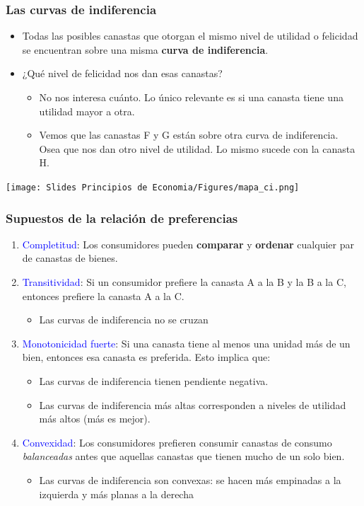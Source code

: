 \documentclass{beamer}
\begin{document}
\begin{frame}
\frametitle{Las curvas de indiferencia}
\begin{itemize}
    \item Todas las posibles canastas que otorgan el mismo nivel de utilidad o felicidad se encuentran sobre una misma \textbf{curva de indiferencia}. \vspace{2mm}
    \item ¿Qué nivel de felicidad nos dan esas canastas? 
    \begin{itemize}
    \item No nos interesa cuánto. Lo único relevante es si una canasta tiene una utilidad mayor a otra. 
    \item Vemos que las canastas F y G están sobre otra curva de indiferencia. Osea que nos dan otro nivel de utilidad. Lo mismo sucede con la canasta H. \vspace{1mm}
    \end{itemize}
     \end{itemize}
    \centering
    \texttt{[image: Slides Principios de Economia/Figures/mapa\_ci.png]}
\end{frame}

\begin{frame}
\frametitle{Supuestos de la relación de preferencias}
\begin{enumerate}
\item \textcolor{blue}{Completitud}: Los consumidores pueden \textbf{comparar} y \textbf{ordenar} cualquier par de canastas de bienes.
\item \textcolor{blue}{Transitividad}: Si un consumidor prefiere la canasta A a la B y la B a la C, entonces prefiere la canasta A a la C.
    \begin{itemize}
        \item Las curvas de indiferencia no se cruzan
    \end{itemize}
\item \textcolor{blue}{Monotonicidad fuerte}: Si una canasta tiene al menos una unidad más de un bien, entonces esa canasta es preferida. Esto implica que:
    \begin{itemize}
        \item Las curvas de indiferencia tienen pendiente negativa. 
        \item Las curvas de indiferencia más altas corresponden a niveles de utilidad más altos (más es mejor).
    \end{itemize}

\item \textcolor{blue}{Convexidad}: Los consumidores prefieren consumir canastas de consumo \textit{balanceadas} antes que aquellas canastas que tienen mucho de un solo bien.
    \begin{itemize}
        \item Las curvas de indiferencia son convexas: se hacen más empinadas a la izquierda y más planas a la derecha 
    \end{itemize}
\end{enumerate} 
\end{frame}
\end{document}
